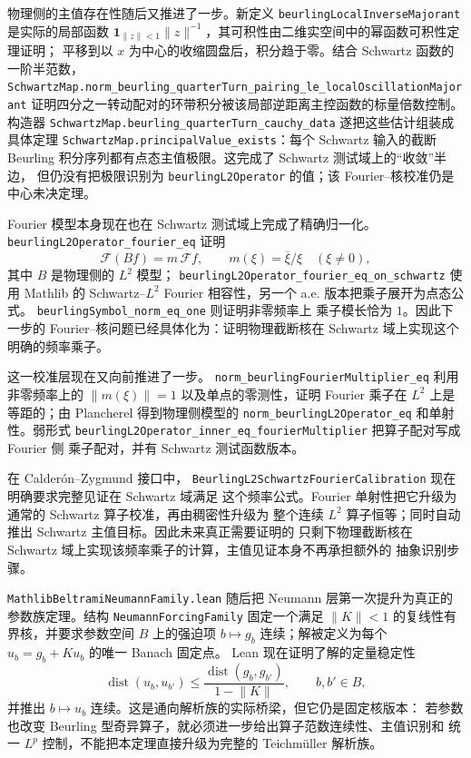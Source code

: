 \documentclass[UTF8,fontset=none,a4paper,11pt]{ctexart}
\begin{document}
物理侧的主值存在性随后又推进了一步。新定义
\texttt{beurlingLocalInverseMajorant} 是实际的局部函数
\(\mathbf 1_{\lVert z\rVert<1}\lVert z\rVert^{-1}\)，其可积性由二维实空间中的幂函数可积性定理证明；
平移到以 $x$ 为中心的收缩圆盘后，积分趋于零。结合 Schwartz 函数的一阶半范数，
\texttt{SchwartzMap\allowbreak.norm\allowbreak\_beurling\allowbreak\_quarterTurn\allowbreak\_pairing\allowbreak\_le\allowbreak\_localOscillationMajorant}
证明四分之一转动配对的环带积分被该局部逆距离主控函数的标量倍数控制。
构造器 \texttt{SchwartzMap\allowbreak.beurling\allowbreak\_quarterTurn\allowbreak\_cauchy\allowbreak\_data}
遂把这些估计组装成具体定理
\texttt{SchwartzMap\allowbreak.principalValue\allowbreak\_exists}：每个 Schwartz 输入的截断
Beurling 积分序列都有点态主值极限。这完成了 Schwartz 测试域上的“收敛”半边，
但仍没有把极限识别为 \texttt{beurlingL2Operator} 的值；该 Fourier--核校准仍是中心未决定理。\par

Fourier 模型本身现在也在 Schwartz 测试域上完成了精确归一化。
\texttt{beurlingL2Operator\allowbreak\_fourier\allowbreak\_eq} 证明
\[
 \mathcal F(Bf)=m\,\mathcal Ff,
 \qquad m(\xi)=\overline\xi/\xi\quad(\xi\ne0),
\]
其中 $B$ 是物理侧的 $L^2$ 模型；
\texttt{beurlingL2Operator\allowbreak\_fourier\allowbreak\_eq\allowbreak\_on\allowbreak\_schwartz}
使用 Mathlib 的 Schwartz--$L^2$ Fourier 相容性，另一个 a.e. 版本把乘子展开为点态公式。
\texttt{beurlingSymbol\allowbreak\_norm\allowbreak\_eq\allowbreak\_one} 则证明非零频率上
乘子模长恰为 $1$。因此下一步的 Fourier--核问题已经具体化为：证明物理截断核在 Schwartz
域上实现这个明确的频率乘子。\par

这一校准层现在又向前推进了一步。
\texttt{norm\_beurlingFourierMultiplier\_eq} 利用非零频率上的
$\lVert m(\xi)\rVert=1$ 以及单点的零测性，证明 Fourier 乘子在 $L^2$ 上是等距的；由
Plancherel 得到物理侧模型的
\texttt{norm\_beurlingL2Operator\_eq} 和单射性。弱形式
\texttt{beurlingL2Operator\_inner\_eq\_fourierMultiplier} 把算子配对写成 Fourier 侧
乘子配对，并有 Schwartz 测试函数版本。

在 Calderón--Zygmund 接口中，
\texttt{BeurlingL2SchwartzFourierCalibration} 现在明确要求完整见证在 Schwartz 域满足
这个频率公式。Fourier 单射性把它升级为通常的 Schwartz 算子校准，再由稠密性升级为
整个连续 $L^2$ 算子恒等；同时自动推出 Schwartz 主值目标。因此未来真正需要证明的
只剩下物理截断核在 Schwartz 域上实现该频率乘子的计算，主值见证本身不再承担额外的
抽象识别步骤。\par

\texttt{MathlibBeltramiNeumannFamily}\allowbreak\texttt{.lean} 随后把 Neumann 层第一次提升为真正的
参数族定理。结构 \texttt{NeumannForcingFamily} 固定一个满足
\(\lVert K\rVert<1\) 的复线性有界核，并要求参数空间 \(B\) 上的强迫项
\(b\mapsto g_b\) 连续；解被定义为每个 \(u_b=g_b+K u_b\) 的唯一 Banach 固定点。
Lean 现在证明了解的定量稳定性
\[
 \operatorname{dist}(u_b,u_{b'})
 \leq
 \frac{\operatorname{dist}(g_b,g_{b'})}{1-\lVert K\rVert},
 \qquad b,b'\in B,
\]
并推出 \(b\mapsto u_b\) 连续。这是通向解析族的实际桥梁，但它仍是固定核版本：
若参数也改变 Beurling 型奇异算子，就必须进一步给出算子范数连续性、主值识别和
统一 \(L^p\) 控制，不能把本定理直接升级为完整的 Teichmüller 解析族。\par
\end{document}
